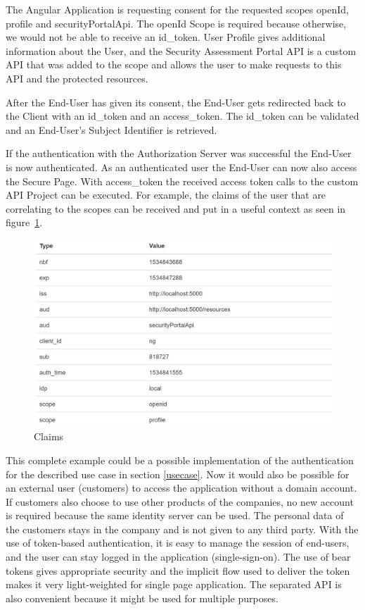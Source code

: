 The Angular Application is requesting consent for the requested scopes openId, profile and securityPortalApi. The openId Scope is required because otherwise, we would not be able to receive an id\_token. User Profile gives additional information about the User, and the  Security Assessment Portal API is a custom API that was added to the scope and allows the user to make requests to this API and the protected resources. 


After the End-User has given its consent, the End-User gets redirected back to the Client with an id\_token and an access\_token. The id\_token can be validated and an End-User’s Subject Identifier is retrieved.

If the authentication with the Authorization Server was successful the End-User is now authenticated. As an authenticated user the End-User can now also access the Secure Page. With access\_token the received access token calls to the custom API Project can be executed. For example, the claims of the user that are correlating to the scopes can be received and put in a useful context as seen in figure~\ref{fig:claims}.


\begin{figure}[h]
	\centering
	\includegraphics[width=0.7\linewidth]{images/claims}
	\caption{Claims}
	\label{fig:claims}
\end{figure}


This complete example could be a possible implementation of the authentication for the described use case in section \ref{usecase}. Now it would also be possible for an external user (customers) to access the application without a domain account. If customers also choose to use other products of the companies, no new account is required because the same identity server can be used. The personal data of the customers stays in the company and is not given to any third party. With the use of token-based authentication, it is easy to manage the session of end-users, and the user can stay logged in the application (single-sign-on). The use of bear tokens gives appropriate security and the implicit flow used to deliver the token makes it very light-weighted for single page application. The separated API is also convenient because it might be used for multiple purposes.

\chapterend
